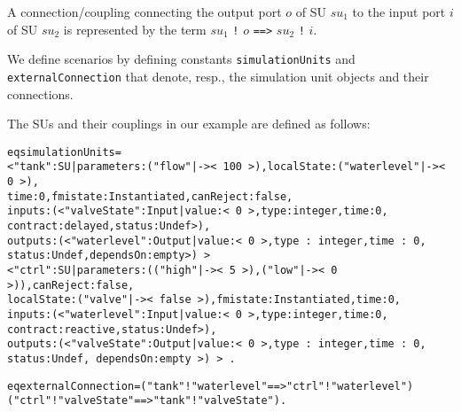 A connection/coupling connecting the output port $o$ of SU $\mathit{su}_1$ to
the input port $i$ of SU $\mathit{su}_2$ is represented by the term
$\mathit{su}_1$ \texttt{!} $o$ \texttt{==>}
$\mathit{su}_2$ \texttt{!} $i$.   %



We define scenarios by defining constants \texttt{simulationUnits}
and \texttt{externalConnection} that denote, resp.,  the
simulation unit objects and  their connections. 

\begin{example}\label{ex:simulationunits}
The SUs and their couplings in our  example are defined as
follows:

\scriptsize
\begin{alltt}
eq simulationUnits = 
   < "tank" : SU | parameters : ("flow" |-> <\,100\,>),  localState : ("waterlevel" |-> <\,0\,>),
                   time : 0,  fmistate : Instantiated, canReject : false, 
                   inputs : (< "valveState" : Input | value : <\,0\,>, type : integer, time : 0,
                                                      contract : delayed, status : Undef >), 
                   outputs : (< "waterlevel" : Output | value : <\,0\,>, type\,:\,integer, time\,:\,0,
                                                        status : Undef, dependsOn : empty >)\,>
   < "ctrl" : SU | parameters : (("high" |-> <\,5\,>) , ("low" |-> <\,0\,>)), canReject : false, 
                   localState : ("valve" |-> <\,false\,>), fmistate : Instantiated, time : 0, 
                   inputs : (< "waterlevel" : Input | value : <\,0\,>, type : integer, time : 0,
                                                      contract : reactive, status : Undef >), 
                   outputs : (< "valveState" : Output | value : <\,0\,>, type\,:\,integer, time\,:\,0,
                                                        status : Undef,\,dependsOn : empty\,>)\,>\,.

eq externalConnection = ("tank" ! "waterlevel" ==> "ctrl" ! "waterlevel") 
                        ("ctrl" ! "valveState" ==> "tank" ! "valveState") .
\end{alltt}
\normalsize
\end{example}

